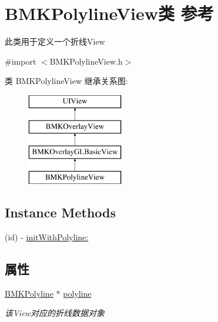 \hypertarget{interface_b_m_k_polyline_view}{\section{B\+M\+K\+Polyline\+View类 参考}
\label{interface_b_m_k_polyline_view}
}


此类用于定义一个折线\+View  




{\ttfamily \#import $<$B\+M\+K\+Polyline\+View.\+h$>$}

类 B\+M\+K\+Polyline\+View 继承关系图\+:\begin{figure}[H]
\begin{center}
\leavevmode
\includegraphics[height=4.000000cm]{interface_b_m_k_polyline_view}
\end{center}
\end{figure}
\subsection*{Instance Methods}
\begin{DoxyCompactItemize}
\item 
(id) -\/ \hyperlink{interface_b_m_k_polyline_view_a9e771508504ccb0fdf491dcb406e23ed}{init\+With\+Polyline\+:}
\end{DoxyCompactItemize}
\subsection*{属性}
\begin{DoxyCompactItemize}
\item 
\hypertarget{interface_b_m_k_polyline_view_a780ecfc589530cc4514e790422730e5f}{\hyperlink{interface_b_m_k_polyline}{B\+M\+K\+Polyline} $\ast$ \hyperlink{interface_b_m_k_polyline_view_a780ecfc589530cc4514e790422730e5f}{polyline}}\label{interface_b_m_k_polyline_view_a780ecfc589530cc4514e790422730e5f}

\begin{DoxyCompactList}\small\item\em 该\+View对应的折线数据对象 \end{DoxyCompactList}\end{DoxyCompactItemize}
